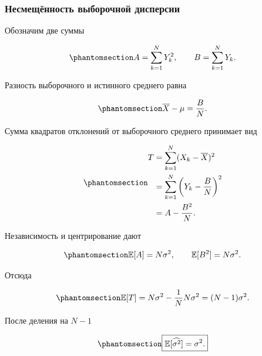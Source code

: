 \documentclass[
  russian,
  11pt,
  a4paper,
  open=any]{scrbook}
\begin{document}
\begin{bookderivation}

\subsubsection{Несмещённость выборочной
дисперсии}\label{ux43dux435ux441ux43cux435ux449ux451ux43dux43dux43eux441ux442ux44c-ux432ux44bux431ux43eux440ux43eux447ux43dux43eux439-ux434ux438ux441ux43fux435ux440ux441ux438ux438}

Обозначим две суммы

\begin{equation}\protect\phantomsection\label{eq-ch6-centered-sums-ab}{
A=\sum_{k=1}^{N}Y_k^2,
\qquad
B=\sum_{k=1}^{N}Y_k.
}\end{equation}

Разность выборочного и истинного среднего равна

\begin{equation}\protect\phantomsection\label{eq-ch6-sample-mean-centered-sum}{
\overline X-\mu=\frac{B}{N}.
}\end{equation}

Сумма квадратов отклонений от выборочного среднего принимает вид

\begin{equation}\protect\phantomsection\label{eq-ch6-residual-sum-of-squares}{
\begin{aligned}
T
&=\sum_{k=1}^{N}(X_k-\overline X)^2\\
&=\sum_{k=1}^{N}\left(Y_k-\frac BN\right)^2\\
&=A-\frac{B^2}{N}.
\end{aligned}
}\end{equation}

Независимость и центрирование дают

\begin{equation}\protect\phantomsection\label{eq-ch6-ab-expectations}{
\mathbb E[A]=N\sigma^2,
\qquad
\mathbb E[B^2]=N\sigma^2.
}\end{equation}

Отсюда

\begin{equation}\protect\phantomsection\label{eq-ch6-residual-sum-expectation}{
\mathbb E[T]
=N\sigma^2-\frac1N N\sigma^2
=(N-1)\sigma^2.
}\end{equation}

После деления на \(N-1\)

\begin{equation}\protect\phantomsection\label{eq-ch6-sample-variance-unbiased}{
\boxed{
\mathbb E[\widehat{\sigma^2}]=\sigma^2.
}
}\end{equation}

\end{bookderivation}
\end{document}
